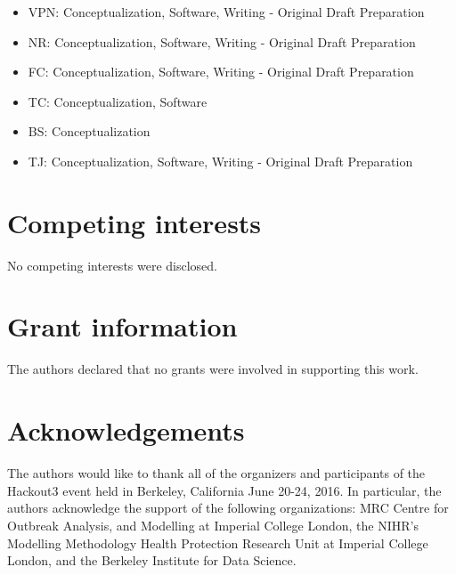 \documentclass[9pt,a4paper,]{extarticle}
\theoremstyle{definition}
\theoremstyle{definition}
\theoremstyle{definition}
\theoremstyle{remark}
\begin{document}
\begin{itemize}
\item
  VPN: Conceptualization, Software, Writing - Original Draft Preparation
\item
  NR: Conceptualization, Software, Writing - Original Draft Preparation
\item
  FC: Conceptualization, Software, Writing - Original Draft Preparation
\item
  TC: Conceptualization, Software
\item
  BS: Conceptualization
\item
  TJ: Conceptualization, Software, Writing - Original Draft Preparation
\end{itemize}

\section{Competing interests}\label{competing-interests}

No competing interests were disclosed.

\section{Grant information}\label{grant-information}

The authors declared that no grants were involved in supporting this work.

\section{Acknowledgements}\label{acknowledgements}

The authors would like to thank all of the organizers and participants of the Hackout3 event held in Berkeley, California June 20-24, 2016. In particular, the authors acknowledge the support of the following organizations: MRC Centre for Outbreak Analysis, and Modelling at Imperial College London, the NIHR's Modelling Methodology Health Protection Research Unit at Imperial College London, and the Berkeley Institute for Data Science.

{\small}
\end{document}
